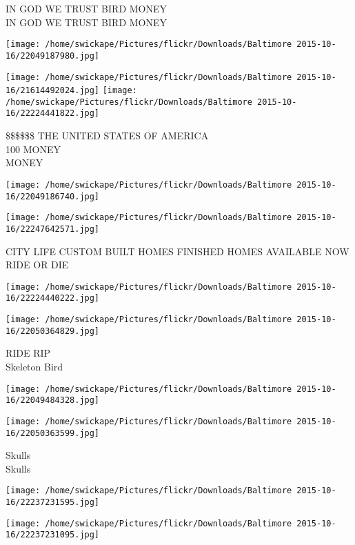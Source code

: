 \documentclass[10pt,letterpaper]{article}
\begin{document}
IN GOD WE TRUST BIRD MONEY\\
IN GOD WE TRUST BIRD MONEY
\pagebreak

\texttt{[image: /home/swickape/Pictures/flickr/Downloads/Baltimore 2015-10-16/22049187980.jpg]}

\vspace{0.25in}
\texttt{[image: /home/swickape/Pictures/flickr/Downloads/Baltimore 2015-10-16/21614492024.jpg]}
\texttt{[image: /home/swickape/Pictures/flickr/Downloads/Baltimore 2015-10-16/22224441822.jpg]}

\$\$\$\$\$\$ THE UNITED STATES OF AMERICA\\
100 MONEY\\
MONEY
\pagebreak

\texttt{[image: /home/swickape/Pictures/flickr/Downloads/Baltimore 2015-10-16/22049186740.jpg]}

\vspace{0.25in}
\texttt{[image: /home/swickape/Pictures/flickr/Downloads/Baltimore 2015-10-16/22247642571.jpg]}

CITY LIFE CUSTOM BUILT HOMES FINISHED HOMES AVAILABLE NOW\\
RIDE OR DIE
\pagebreak

\texttt{[image: /home/swickape/Pictures/flickr/Downloads/Baltimore 2015-10-16/22224440222.jpg]}

\vspace{0.25in}
\texttt{[image: /home/swickape/Pictures/flickr/Downloads/Baltimore 2015-10-16/22050364829.jpg]}

RIDE RIP\\
Skeleton Bird
\pagebreak

\texttt{[image: /home/swickape/Pictures/flickr/Downloads/Baltimore 2015-10-16/22049484328.jpg]}

\vspace{0.25in}
\texttt{[image: /home/swickape/Pictures/flickr/Downloads/Baltimore 2015-10-16/22050363599.jpg]}

Skulls\\
Skulls
\pagebreak

\texttt{[image: /home/swickape/Pictures/flickr/Downloads/Baltimore 2015-10-16/22237231595.jpg]}

\vspace{0.25in}
\texttt{[image: /home/swickape/Pictures/flickr/Downloads/Baltimore 2015-10-16/22237231095.jpg]}
\end{document}
